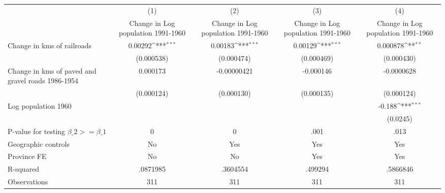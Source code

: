 {
\def\sym#1{\ifmmode^{#1}\else\(^{#1}\)\fi}
\begin{tabular}{l*{4}{c}}
\hline\hline
                &\multicolumn{1}{c}{(1)}&\multicolumn{1}{c}{(2)}&\multicolumn{1}{c}{(3)}&\multicolumn{1}{c}{(4)}\\
                &\multicolumn{1}{c}{Change in Log population 1991-1960}&\multicolumn{1}{c}{Change in Log population 1991-1960}&\multicolumn{1}{c}{Change in Log population 1991-1960}&\multicolumn{1}{c}{Change in Log population 1991-1960}\\
\hline
Change in kms of railroads&  0.00292\sym{***}&  0.00183\sym{***}&  0.00129\sym{***}& 0.000878\sym{**} \\
                &(0.000538)         &(0.000474)         &(0.000469)         &(0.000430)         \\
[1em]
Change in kms of paved and gravel roads 1986-1954& 0.000173         &-0.00000421         &-0.000146         &-0.0000628         \\
                &(0.000124)         &(0.000130)         &(0.000135)         &(0.000124)         \\
[1em]
Log population 1960&                  &                  &                  &   -0.188\sym{***}\\
                &                  &                  &                  & (0.0245)         \\
\hline
P-value for testing $\beta\_{2} >= \beta\_{1}$&        0         &        0         &     .001         &     .013         \\
Geographic controls&       No         &      Yes         &      Yes         &      Yes         \\
Province FE     &       No         &       No         &      Yes         &      Yes         \\
R-squared       & .0871985         & .3604554         &  .499294         & .5866846         \\
Observations    &      311         &      311         &      311         &      311         \\
\hline\hline
\end{tabular}
}
